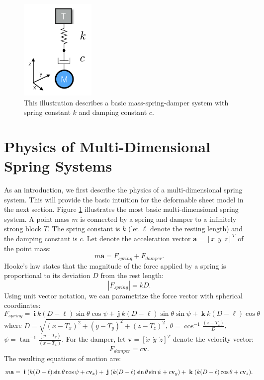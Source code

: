 \begin{figure}[t]
\centering
\includegraphics[width=0.32\textwidth]{tps-experiments/msd-1.png}
\caption{This illustration describes a basic mass-spring-damper system with spring constant $k$ and damping constant $c$. \label{illus:1}}
\end{figure}

\section{Physics of Multi-Dimensional Spring Systems}
As an introduction, we first describe the physics of a multi-dimensional spring system. This will provide the basic intuition for the deformable sheet model in the next section.
Figure \ref{illus:1} illustrates the most basic multi-dimensional spring system. A point mass $m$ is connected by a spring and damper to a infinitely strong block $T$. The spring constant is $k$ (let $\ell$ denote the resting length) and the damping constant is $c$. Let denote the acceleration vector $\mathbf{a} =  [ \ddot{x} ~~ \ddot{y} ~~ \ddot{z} ]^T$ of the point mass: 
\[
m \mathbf{a} = F_{spring} + F_{damper}.
\]
Hooke's law states that the magnitude of the force applied by a spring is proportional to its deviation $D$ from the rest length:
\[
|F_{spring}| = k D .
\]
Using unit vector notation, we can parametrize the force vector with spherical coordinates:
\[
F_{spring} =  ~\mathbf{i}~ k (D - \ell) \sin \theta \cos \psi +  ~\mathbf{j}~ k (D - \ell) \sin \theta \sin \psi + ~ \mathbf{k}~ k (D - \ell) \cos \theta 
\]
where $D = \sqrt{ (x-T_x)^2 + (y-T_y)^2 + (z-T_z)^2} $, $\theta = \cos^{-1} \frac{(z - T_z) }{D} $, $\psi = \tan ^{-1} \frac{(y - T_y) }{(x - T_x)}$.
For the damper, let $\mathbf{v} =  [ \dot{x} ~~ \dot{y} ~~ \dot{z} ]^T$ denote the velocity vector:
\[ F_{damper} = c \mathbf{v} .\]
The resulting equations of motion are:
\begin{equation}\footnotesize \selectfont
   m \mathbf{a} = ~\mathbf{i}~ (k (D - \ell) \sin \theta \cos \psi + c \mathbf{v}_x) +  ~\mathbf{j}~ (k (D - \ell) \sin \theta \sin \psi + c \mathbf{v}_y) + ~ \mathbf{k}~ (k (D - \ell) \cos \theta + c \mathbf{v}_z).
\end{equation}



